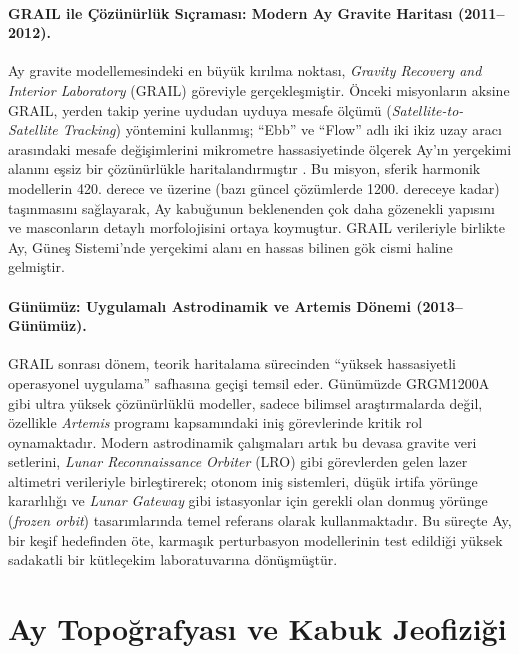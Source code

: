 \paragraph{GRAIL ile Çözünürlük Sıçraması: Modern Ay Gravite Haritası (2011--2012).}
Ay gravite modellemesindeki en büyük kırılma noktası, \textit{Gravity Recovery and Interior Laboratory} (GRAIL) göreviyle gerçekleşmiştir. Önceki misyonların aksine GRAIL, yerden takip yerine uydudan uyduya mesafe ölçümü (\textit{Satellite-to-Satellite Tracking}) yöntemini kullanmış; ``Ebb'' ve ``Flow'' adlı iki ikiz uzay aracı arasındaki mesafe değişimlerini mikrometre hassasiyetinde ölçerek Ay'ın yerçekimi alanını eşsiz bir çözünürlükle haritalandırmıştır \cite{Zuber2013}. Bu misyon, sferik harmonik modellerin 420. derece ve üzerine (bazı güncel çözümlerde 1200. dereceye kadar) taşınmasını sağlayarak, Ay kabuğunun beklenenden çok daha gözenekli yapısını ve masconların detaylı morfolojisini ortaya koymuştur. GRAIL verileriyle birlikte Ay, Güneş Sistemi'nde yerçekimi alanı en hassas bilinen gök cismi haline gelmiştir.



\paragraph{Günümüz: Uygulamalı Astrodinamik ve Artemis Dönemi (2013--Günümüz).}
GRAIL sonrası dönem, teorik haritalama sürecinden ``yüksek hassasiyetli operasyonel uygulama'' safhasına geçişi temsil eder. Günümüzde GRGM1200A gibi ultra yüksek çözünürlüklü modeller, sadece bilimsel araştırmalarda değil, özellikle \textit{Artemis} programı kapsamındaki iniş görevlerinde kritik rol oynamaktadır. Modern astrodinamik çalışmaları artık bu devasa gravite veri setlerini, \textit{Lunar Reconnaissance Orbiter} (LRO) gibi görevlerden gelen lazer altimetri verileriyle birleştirerek; otonom iniş sistemleri, düşük irtifa yörünge kararlılığı ve \textit{Lunar Gateway} gibi istasyonlar için gerekli olan donmuş yörünge (\textit{frozen orbit}) tasarımlarında temel referans olarak kullanmaktadır. Bu süreçte Ay, bir keşif hedefinden öte, karmaşık perturbasyon modellerinin test edildiği yüksek sadakatli bir kütleçekim laboratuvarına dönüşmüştür.




\section{Ay Topoğrafyası ve Kabuk Jeofiziği}
\label{sec:moon_topography}

